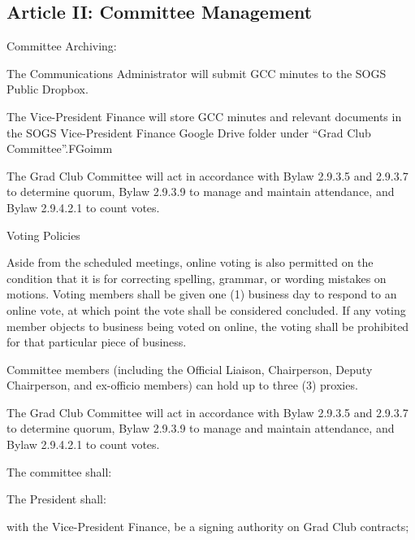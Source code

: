 \subsection{Article II: Committee Management}
\begin{longenum}[ label*=\thesubsection.\arabic*., align=left] 
\item Committee Archiving:
	\begin{longenum}[ label*=\arabic*., align=left]
	\item The Communications Administrator will submit GCC minutes to the SOGS Public Dropbox.
	\item The Vice-President Finance will store GCC minutes and relevant documents in the SOGS Vice-President Finance Google Drive folder under “Grad Club Committee”.FGoimm
	\item The Grad Club Committee will act in accordance with Bylaw 2.9.3.5 and 2.9.3.7 to determine quorum, Bylaw 2.9.3.9 to manage and maintain attendance, and Bylaw 2.9.4.2.1 to count votes.
	\end{longenum}
\item Voting Policies
	\begin{longenum}[ label*=\arabic*., align=left]
	\item Aside from the scheduled meetings, online voting is also permitted on the condition that it is for correcting spelling, grammar, or wording mistakes on motions. Voting members shall be given one (1) business day to respond to an online vote, at which point the vote shall be considered concluded. If any voting member objects to business being voted on online, the voting shall be prohibited for that particular piece of business.
	\item Committee members (including the Official Liaison, Chairperson, Deputy Chairperson, and ex-officio members) can hold up to three (3) proxies.
	\item The Grad Club Committee will act in accordance with Bylaw 2.9.3.5 and 2.9.3.7 to determine quorum, Bylaw 2.9.3.9 to manage and maintain attendance, and Bylaw 2.9.4.2.1 to count votes.
	\end{longenum}
\item The committee shall:
	\begin{longenum}[ label*=\arabic*., align=left]
	\item The President shall:
		\begin{longenum}[ label*=\arabic*., align=left]
		\item with the Vice-President Finance, be a signing authority on Grad Club contracts;

\end{longenum}
\end{longenum}
\end{longenum}
